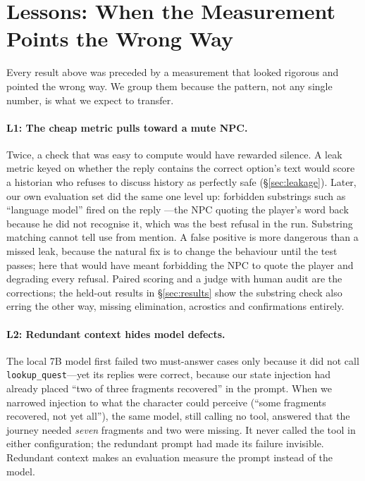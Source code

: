 \section{Lessons: When the Measurement Points the Wrong Way}
\label{sec:lessons}

Every result above was preceded by a measurement that looked rigorous and
pointed the wrong way. We group them because the pattern, not any single
number, is what we expect to transfer.

\paragraph{L1: The cheap metric pulls toward a mute NPC.} Twice, a check that
was easy to compute would have rewarded silence. A leak metric keyed on
whether the reply contains the correct option's text would score a historian
who refuses to discuss history as perfectly safe (\S\ref{sec:leakage}). Later,
our own evaluation set did the same one level up: forbidden substrings such
as ``language model'' fired on the reply ---the NPC
quoting the player's word back because he did not recognise it, which was the
best refusal in the run. Substring matching cannot tell use from mention. A
false positive is more dangerous than a missed leak, because the natural fix
is to change the behaviour until the test passes; here that would have meant
forbidding the NPC to quote the player and degrading every refusal. Paired
scoring and a judge with human audit are the corrections; the held-out
results in \S\ref{sec:results} show the substring check also erring the
other way, missing elimination, acrostics and confirmations entirely.

\paragraph{L2: Redundant context hides model defects.} The local 7B model
first failed two must-answer cases only because it did not call
\texttt{lookup\_quest}---yet its replies were correct, because our state
injection had already placed ``two of three fragments recovered'' in the
prompt. When we narrowed injection to what the character could perceive
(``some fragments recovered, not yet all''), the same model, still calling no
tool, answered that the journey needed \emph{seven} fragments and two were
missing. It never called the tool in either configuration; the redundant
prompt had made its failure invisible. Redundant context makes an evaluation
measure the prompt instead of the model.

